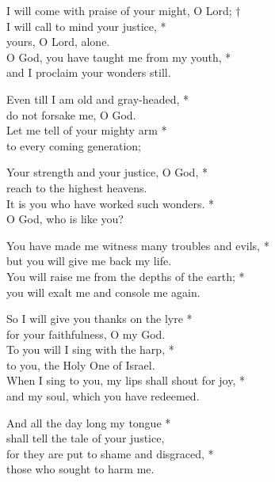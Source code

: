 I will come with praise of your might, O Lord; †\\
I will call to mind your justice, *\\
yours, O Lord, alone. \\
O God, you have taught me from my youth, *\\
and I proclaim your wonders still. 

Even till I am old and gray-headed, *\\
do not forsake me, O God. \\
Let me tell of your mighty arm *\\
to every coming generation; 

Your strength and your justice, O God, *\\
reach to the highest heavens. \\
It is you who have worked such wonders. *\\
O God, who is like you? 

You have made me witness many troubles and evils, *\\
but you will give me back my life. \\
You will raise me from the depths of the earth; *\\
you will exalt me and console me again. 

So I will give you thanks on the lyre *\\
for your faithfulness, O my God. \\
To you will I sing with the harp, *\\
to you, the Holy One of Israel. \\
When I sing to you, my lips shall shout for joy, *\\
and my soul, which you have redeemed. 

And all the day long my tongue *\\
shall tell the tale of your justice, \\
for they are put to shame and disgraced, *\\
those who sought to harm me. 